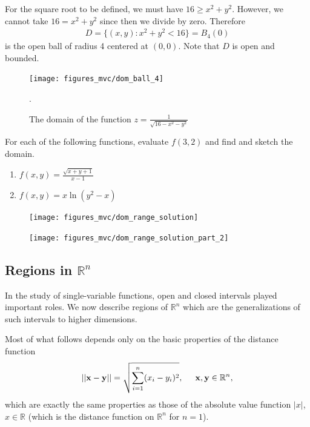 \documentclass[12pt,letterpaper,reqno]{article}
\numberwithin{equation}{section}
\newcommand{\R}{\ensuremath{\mathbb R}}
\newcommand{\bx}{{\bf x}}
\newcommand{\by}{{\bf y}}
\begin{document}
{{\color{red}
\begin{solution}
	For the square root to be defined, we must have $16 \geq x^2+y^2$. However, we cannot take $16=x^2+y^2$ since then we divide by zero. Therefore
	\begin{align*}
		D=\{(x,y):x^2+y^2<16\}=B_4(0)
	\end{align*}
	is the open ball of radius 4 centered at $(0,0)$. Note that $D$ is open and bounded.
	\begin{figure}[h]
		\begin{center}
			\texttt{[image: figures\_mvc/dom\_ball\_4]}
		\end{center}
		\caption{The domain of the function $z=\frac{1}{\sqrt{16-x^2-y^2}}$}.
	\end{figure}
\end{solution}}

\begin{exercise}
For each of the following functions, evaluate $f(3,2)$ and find and sketch the domain.
\begin{enumerate}
	\item $f(x,y)=\frac{\sqrt{x+y+1}}{x-1}$
	\item $f(x,y)=x\ln(y^2-x)$
\end{enumerate} 	
\end{exercise}

\begin{figure}[h]
	\begin{center}
	\texttt{[image: figures\_mvc/dom\_range\_solution]}
\end{center}
\end{figure}

\begin{figure}[h]
	\begin{center}
	\texttt{[image: figures\_mvc/dom\_range\_solution\_part\_2]}
\end{center}
\end{figure}

\subsection{Regions in $\R^n$}\label{sec:regions}
In the study of single-variable functions, open and closed intervals played important roles. We now describe regions of $\R^n$ which are the generalizations of such intervals to higher dimensions.

Most of what follows depends only on the basic properties of the distance function
\begin{align*}
	||\bx-\by||=\sqrt{\sum_{i=1}^n(x_i-y_i)^2}, \hspace{0.5cm} \bx, \by \in \R^n,
\end{align*}
which are exactly the same properties as those of the absolute value function $|x|$, $x \in \R$ (which is the distance function on $\R^n$ for $n=1$).

}
\end{document}
